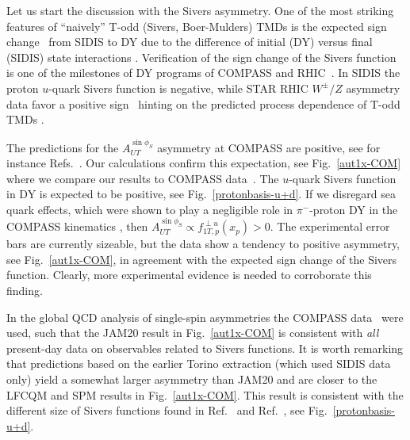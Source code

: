 \documentclass[a4paper]{article}
\begin{document}
Let us start the discussion with the Sivers asymmetry. One of the most striking features of 
 ``naively'' T-odd (Sivers, Boer-Mulders) TMDs is the expected sign 
change~\cite{Collins:2002kn} from SIDIS to DY due to the 
difference of initial  (DY) versus final (SIDIS) state interactions
\cite{Brodsky:2002rv,Boer:2002ju}.
Verification of the sign change of the Sivers function is one of the milestones of DY programs of COMPASS and RHIC~\cite{Aschenauer:2015eha}.
In SIDIS the proton $u$-quark Sivers function is negative,
while STAR RHIC \cite{Adamczyk:2015gyk} $W^\pm/Z$ 
asymmetry data favor a positive sign~\cite{Anselmino:2016uie} hinting on the predicted 
process dependence of T-odd TMDs \cite{Collins:2002kn}.

The predictions for the $A_{UT}^{\sin\phi_S}$ asymmetry at COMPASS are positive, 
see for instance 
Refs.~\cite{Efremov:2004tp,Collins:2005rq,Anselmino:2009st}.
Our calculations confirm this expectation, see 
Fig.~\ref{aut1x-COM} where we compare our results 
to COMPASS data~\cite{Aghasyan:2017jop}.
The $u$-quark Sivers function in DY is expected to be positive, 
see Fig.~\ref{protonbasis-u+d}. 
If we disregard sea quark effects, which were shown to play a 
negligible role in $\pi^-$-proton DY in the COMPASS kinematics
\cite{Collins:2005rq}, then 
$A_{UT}^{\sin\phi_S} \propto f_{1T,p}^{\perp u} (x_p) > 0$.
The experimental error bars are currently sizeable, but the data 
show a tendency to positive asymmetry, see  Fig.~\ref{aut1x-COM}, 
in agreement with the expected sign change of the Sivers function.
Clearly, more experimental evidence is needed to corroborate 
this finding.

In the global QCD analysis of single-spin asymmetries
\cite{Cammarota:2020qcw} the COMPASS data~\cite{Aghasyan:2017jop} 
were used, such that the  JAM20 result in Fig.~\ref{aut1x-COM}
is consistent with {\em all} present-day data on  observables related
to Sivers functions. It is worth remarking that predictions based 
on the earlier Torino extraction \cite{Anselmino:2011gs}
(which used SIDIS data only) yield a somewhat larger 
asymmetry than JAM20 and are closer to the LFCQM and SPM
results in Fig.~\ref{aut1x-COM}.
This result is consistent with the different size of Sivers functions found in Ref.~\cite{Anselmino:2011gs} and Ref.~\cite{Cammarota:2020qcw}, see Fig.~\ref{protonbasis-u+d}.
\end{document}
